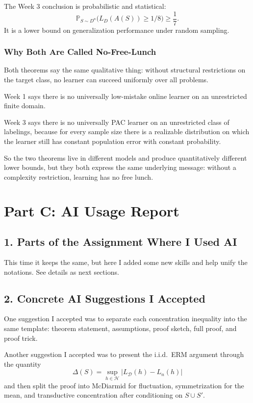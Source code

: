 \documentclass{article}
\theoremstyle{definition}
\theoremstyle{remark}
\newcommand{\PP}{\mathbb{P}}
\newcommand{\cH}{\mathcal{H}}
\newcommand{\cD}{\mathcal{D}}
\begin{document}
The Week 3 conclusion is probabilistic and statistical:
$$
\PP_{S\sim D^n}\bigl(L_D(A(S))\ge 1/8\bigr)\ge \frac{1}{7}.
$$
It is a lower bound on generalization performance under random sampling.

\subsubsection{Why Both Are Called No-Free-Lunch}

Both theorems say the same qualitative thing: without structural restrictions on the target class, no learner can succeed uniformly over all problems.

Week 1 says there is no universally low-mistake online learner on an unrestricted finite domain.

Week 3 says there is no universally PAC learner on an unrestricted class of labelings, because for every sample size there is a realizable distribution on which the learner still has constant population error with constant probability.

So the two theorems live in different models and produce quantitatively different lower bounds, but they both express the same underlying message: without a complexity restriction, learning has no free lunch.

\newpage
\section{Part C: AI Usage Report}

\subsection*{1. Parts of the Assignment Where I Used AI}

This time it keeps the same, but here I added some new skills and help unify the notations. See details as next sections.

\subsection*{2. Concrete AI Suggestions I Accepted}

One suggestion I accepted was to separate each concentration inequality into the same template: theorem statement, assumptions, proof sketch, full proof, and proof trick.

Another suggestion I accepted was to present the i.i.d.\ ERM argument through the quantity
$$
\Delta(S)=\sup_{h\in\cH}|L_{\cD}(h)-L_n(h)|
$$
and then split the proof into McDiarmid for fluctuation, symmetrization for the mean, and transductive concentration after conditioning on $S\cup S'$.
\end{document}
